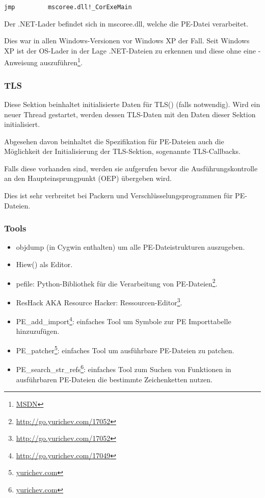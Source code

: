 \begin{lstlisting}
jmp         mscoree.dll!_CorExeMain
\end{lstlisting}

Der .NET-Lader befindet sich in mscoree.dll, welche die PE-Datei verarbeitet.

Dies war in allen Windows-Versionen vor Windows XP der Fall. Seit Windows XP
ist der \ac{OS}-Lader in der Lage .NET-Dateien zu erkennen und diese ohne eine
\JMP-Anweisung auszuführen\footnote{\href{http://go.yurichev.com/17051}{MSDN}}.

\subsubsection{TLS}

Diese Sektion beinhaltet initialisierte Daten für \ac{TLS}() (falls notwendig).
Wird ein neuer Thread gestartet, werden dessen \ac{TLS}-Daten mit den Daten dieser
Sektion initialisiert.

Abgesehen davon beinhaltet die Spezifikation für PE-Dateien auch die Möglichkeit
der Initialisierung der \ac{TLS}-Sektion, sogenannte TLS-Callbacks.

Falls diese vorhanden sind, werden sie aufgerufen bevor die Ausführungskontrolle
an den Haupteinsprungpunkt (\ac{OEP}) übergeben wird.

Dies ist sehr verbreitet bei Packern und Verschlüsselungsprogrammen für PE-Dateien.

\subsubsection{Tools}

\label{ResHack}

\begin{itemize}
\item objdump (in Cygwin enthalten) um alle PE-Dateistrukturen auszugeben.

\item Hiew() als Editor.

\item pefile: Python-Bibliothek für die Verarbeitung von PE-Dateien\footnote{\url{http://go.yurichev.com/17052}}.

\item ResHack \acs{AKA} Resource Hacker: Ressourcen-Editor\footnote{\url{http://go.yurichev.com/17052}}.

\item PE\_add\_import\footnote{\url{http://go.yurichev.com/17049}}: einfaches Tool
um Symbole zur PE Importtabelle hinzuzufügen.

\item PE\_patcher\footnote{\href{http://go.yurichev.com/17054}{yurichev.com}}:
einfaches Tool um ausführbare PE-Dateien zu patchen.

\item PE\_search\_str\_refs\footnote{\href{http://go.yurichev.com/17055}{yurichev.com}}:
einfaches Tool zum Suchen von Funktionen in ausführbaren PE-Dateien die bestimmte
Zeichenketten nutzen.
\end{itemize}

